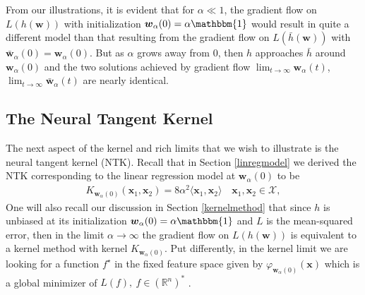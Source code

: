 \documentclass{article}
\begin{document}
From our illustrations, it is evident that for $\alpha \ll 1$, the gradient flow on $L(h(\boldsymbol{w}))$ with initialization $\boldsymbol{w}_{\alpha}(0) = \alpha \mathbbm{1}$ would result in quite a different model than that resulting from the gradient flow on $L(\bar{h}(\boldsymbol{w}))$ with $\boldsymbol{\bar{w}}_{\alpha}(0) = \boldsymbol{w}_{\alpha}(0)$. But as $\alpha$ grows away from $0$, then $h$ approaches $\bar{h}$ around $\boldsymbol{w}_{\alpha}(0)$ and the two solutions achieved by gradient flow $\lim_{t \to \infty} \boldsymbol{w}_{\alpha}(t)$, $\lim_{t \to \infty} \boldsymbol{\bar{w}}_{\alpha}(t)$ are nearly identical.


\subsection{The Neural Tangent Kernel}\label{visualizeNTK}

The next aspect of the kernel and rich limits that we wish to illustrate is the neural tangent kernel (NTK). Recall that in Section \ref{linregmodel} we derived the NTK corresponding to the linear regression model at $\boldsymbol{w}_{\alpha}(0)$ to be
\begin{align*}
K_{\boldsymbol{w}_{\alpha}(0)}(\boldsymbol{x}_1, \boldsymbol{x}_2) = 8\alpha^2 \langle \boldsymbol{x}_1, \boldsymbol{x}_2 \rangle \quad \boldsymbol{x}_1, \boldsymbol{x}_2 \in \mathcal{X},
\end{align*}
One will also recall our discussion in Section \ref{kernelmethod} that since $h$ is unbiased at its initialization $\boldsymbol{w}_{\alpha}(0) = \alpha \mathbbm{1}$ and $L$ is the mean-squared error, then in the limit $\alpha \rightarrow \infty$ the gradient flow on $L(h(\boldsymbol{w}))$ is equivalent to a kernel method with kernel $K_{\boldsymbol{w}_{\alpha}(0)}$. Put differently, in the kernel limit we are looking for a function $f^{\star}$ in the fixed feature space given by $\varphi_{\boldsymbol{w}_{\alpha}(0)}(\boldsymbol{x})$ which is a global minimizer of $L(f), \ f \in (\mathbb{R}^n)^*$ \cite{wei2019regularization}.
\end{document}
